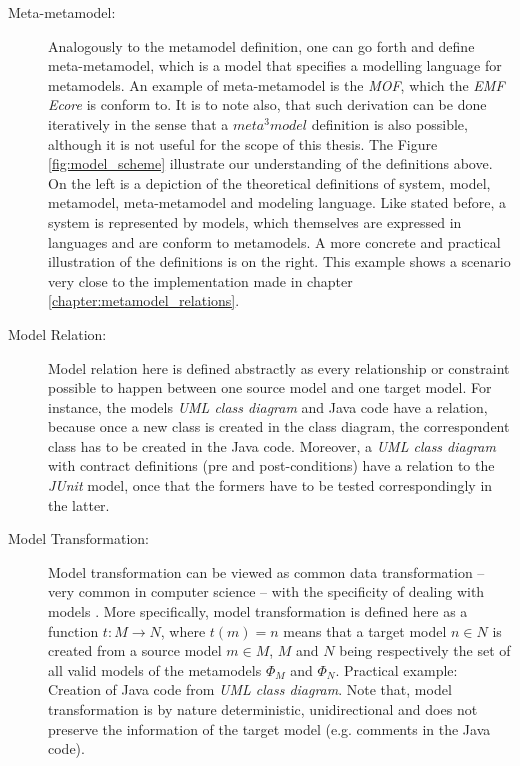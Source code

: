 \documentclass[tuberlin,cic,tc,english,noabntcite]{iiufrgs}
\begin{document}
\begin{description}
	\item[Meta-metamodel:] Analogously to the metamodel definition, one can go forth and define meta-metamodel, which is a model that specifies a modelling language for metamodels. An example of meta-metamodel is the \emph{MOF}\citep{omg2015meta}, which the \emph{EMF Ecore} is conform to. It is to note also, that such derivation can be done iteratively in the sense that a $meta^3model$ definition is also possible, although it is not useful for the scope of this thesis. The Figure \ref{fig:model_scheme} illustrate our understanding of the definitions above. On the left is a depiction of the theoretical definitions of system, model, metamodel, meta-metamodel and modeling language. Like stated before, a system is represented by models, which themselves are expressed in languages and are conform to metamodels. A more concrete and practical illustration of the definitions is on the right. This example shows a scenario very close to the implementation made in chapter \ref{chapter:metamodel_relations}.
	
	\item[Model Relation:] Model relation here is defined abstractly as every relationship or constraint possible to happen between one source model and one target model. For instance, the models \emph{UML class diagram} and Java code have a relation, because once a new class is created in the class diagram, the correspondent class has to be created in the Java code. Moreover, a \emph{UML class diagram} with contract definitions (pre and post-conditions) have a relation to the \emph{JUnit} model, once that the formers have to be tested correspondingly in the latter.

	\item[Model Transformation:] Model transformation can be viewed as common data transformation – very common in computer science – with the specificity of dealing with models \citep{czarnecki2006feature}. More specifically, model transformation is defined here as a function $t : M \rightarrow N$, where $t(m) = n$ means that a target model $n \in N$ is created from a source model $m \in M$, $M$ and $N$ being respectively the set of all valid models of the metamodels $\Phi_M$ and $\Phi_N$. Practical example: Creation of Java code from \emph{UML class diagram}. Note that, model transformation is by nature deterministic, unidirectional and does not preserve the information of the target model (e.g. comments in the Java code).


\end{description}
\end{document}
